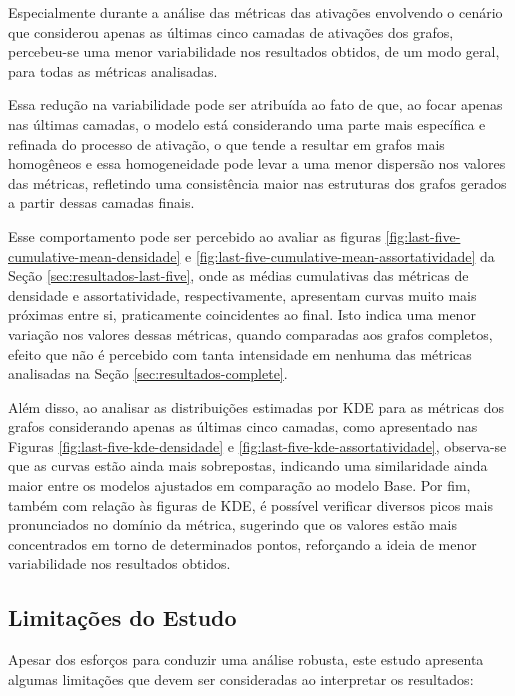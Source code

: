 Especialmente durante a análise das métricas das ativações envolvendo o cenário que considerou apenas as últimas cinco camadas de ativações dos grafos, percebeu-se uma menor variabilidade nos resultados obtidos, de um modo geral, para todas as métricas analisadas.

Essa redução na variabilidade pode ser atribuída ao fato de que, ao focar apenas nas últimas camadas, o modelo está considerando uma parte mais específica e refinada do processo de ativação, o que tende a resultar em grafos mais homogêneos e essa homogeneidade pode levar a uma menor dispersão nos valores das métricas, refletindo uma consistência maior nas estruturas dos grafos gerados a partir dessas camadas finais.

Esse comportamento pode ser percebido ao avaliar as figuras \ref{fig:last-five-cumulative-mean-densidade} e \ref{fig:last-five-cumulative-mean-assortatividade} da Seção \ref{sec:resultados-last-five}, onde as médias cumulativas das métricas de densidade e assortatividade, respectivamente, apresentam curvas muito mais próximas entre si, praticamente coincidentes ao final. Isto indica uma menor variação nos valores dessas métricas, quando comparadas aos grafos completos, efeito que não é percebido com tanta intensidade em nenhuma das métricas analisadas na Seção \ref{sec:resultados-complete}.

Além disso, ao analisar as distribuições estimadas por KDE para as métricas dos grafos considerando apenas as últimas cinco camadas, como apresentado nas Figuras \ref{fig:last-five-kde-densidade} e \ref{fig:last-five-kde-assortatividade}, observa-se que as curvas estão ainda mais sobrepostas, indicando uma similaridade ainda maior entre os modelos ajustados em comparação ao modelo Base. Por fim, também com relação às figuras de KDE, é possível verificar diversos picos mais pronunciados no domínio da métrica, sugerindo que os valores estão mais concentrados em torno de determinados pontos, reforçando a ideia de menor variabilidade nos resultados obtidos.

\subsection{Limitações do Estudo}

Apesar dos esforços para conduzir uma análise robusta, este estudo apresenta algumas limitações que devem ser consideradas ao interpretar os resultados:

